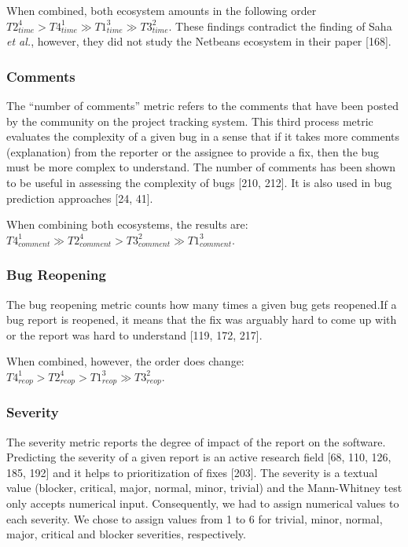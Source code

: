 \documentclass[12pt]{report}
\begin{document}
When combined, both ecosystem amounts in the following order
\(T2_{time}^4 > T4_{time}^1 \gg T1_{time}^3 \gg T3_{time}^2\). These
findings contradict the finding of Saha \emph{et al.}, however, they did
not study the Netbeans ecosystem in their paper {[}168{]}.

\subsubsection{Comments}\label{comments}

The ``number of comments'' metric refers to the comments that have been
posted by the community on the project tracking system. This third
process metric evaluates the complexity of a given bug in a sense that
if it takes more comments (explanation) from the reporter or the
assignee to provide a fix, then the bug must be more complex to
understand. The number of comments has been shown to be useful in
assessing the complexity of bugs {[}210, 212{]}. It is also used in bug
prediction approaches {[}24, 41{]}.

When combining both ecosystems, the results are:
\(T4_{comment}^1 \gg T2_{comment}^4 > T3_{comment}^2 \gg T1_{comment}^3\).

\subsubsection{Bug Reopening}\label{bug-reopening}

The bug reopening metric counts how many times a given bug gets
reopened.If a bug report is reopened, it means that the fix was arguably
hard to come up with or the report was hard to understand {[}119, 172,
217{]}.

When combined, however, the order does change:
\(T4_{reop}^1 > T2_{reop}^4 > T1_{reop}^3 \gg T3_{reop}^2\).

\subsubsection{Severity}\label{severity}

The severity metric reports the degree of impact of the report on the
software. Predicting the severity of a given report is an active
research field {[}68, 110, 126, 185, 192{]} and it helps to
prioritization of fixes {[}203{]}. The severity is a textual value
(blocker, critical, major, normal, minor, trivial) and the Mann-Whitney
test only accepts numerical input. Consequently, we had to assign
numerical values to each severity. We chose to assign values from 1 to 6
for trivial, minor, normal, major, critical and blocker severities,
respectively.
\end{document}
